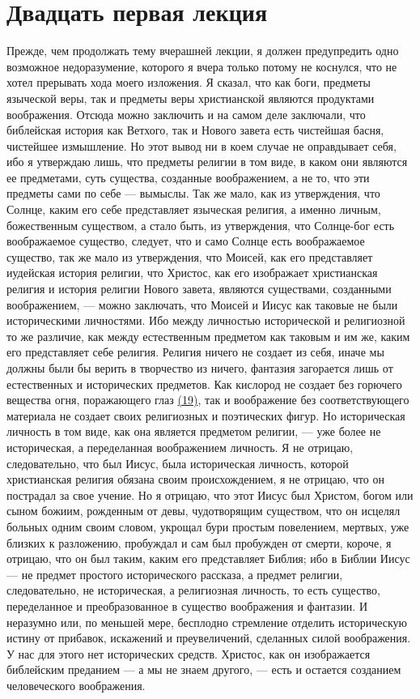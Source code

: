\documentclass[12pt]{article}
\begin{document}
{}
\section*{Двадцать первая лекция}

Прежде, чем продолжать тему вчерашней лекции, я должен предупредить одно возможное недоразумение, которого я вчера только потому не коснулся, что не хотел прерывать хода моего изложения. Я сказал, что как боги, предметы языческой веры, так и предметы веры христианской являются продуктами воображения. Отсюда можно заключить и на самом деле заключали, что библейская история как Ветхого, так и Нового завета есть чистейшая басня, чистейшее измышление. Но этот вывод ни в коем случае не оправдывает себя, ибо я утверждаю лишь, что предметы религии в том виде, в каком они являются ее предметами, суть существа, созданные воображением, а не то, что эти предметы сами по себе --- вымыслы. Так же мало, как из утверждения, что Солнце, каким его себе представляет языческая религия, а именно личным, божественным существом, а стало быть, из утверждения, что Солнце-бог есть воображаемое существо, следует, что и само Солнце есть воображаемое существо, так же мало из утверждения, что Моисей, как его представляет иудейская история религии, что Христос, как его изображает христианская религия и история религии Нового завета, являются существами, созданными воображением, --- можно заключать, что Моисей и Иисус как таковые не были историческими личностями. Ибо между личностью исторической и религиозной то же различие, как между естественным предметом как таковым и им же, каким его представляет себе религия. Религия ничего не создает из себя, иначе мы должны были бы верить в творчество из ничего, фантазия загорается лишь от естественных и исторических предметов. Как кислород не создает без горючего вещества огня, поражающего глаз  \hyperlink{19}{(19)}\hypertarget{b19}{}, так и воображение без соответствующего материала не создает своих религиозных и поэтических фигур. Но историческая личность в том виде, как она является предметом религии, --- уже более не историческая, а переделанная воображением личность. Я не отрицаю, следовательно, что был Иисус, была историческая личность, которой христианская религия обязана своим происхождением, я не отрицаю, что он пострадал за свое учение. Но я отрицаю, что этот Иисус был Христом, богом или сыном божиим, рожденным от девы, чудотворящим существом, что он исцелял больных одним своим словом, укрощал бури простым повелением, мертвых, уже близких к разложению, пробуждал и сам был пробужден от смерти, короче, я отрицаю, что он был таким, каким его представляет Библия; ибо в Библии Иисус --- не предмет простого исторического рассказа, а предмет религии, следовательно, не историческая, а религиозная личность, то есть существо, переделанное и преобразованное в существо воображения и фантазии. И неразумно или, по меньшей мере, бесплодно стремление отделить историческую истину от прибавок, искажений и преувеличений, сделанных силой воображения. У нас для этого нет исторических средств. Христос, как он изображается библейским преданием --- а мы не знаем другого, --- есть и остается созданием человеческого воображения. 
\end{document}

